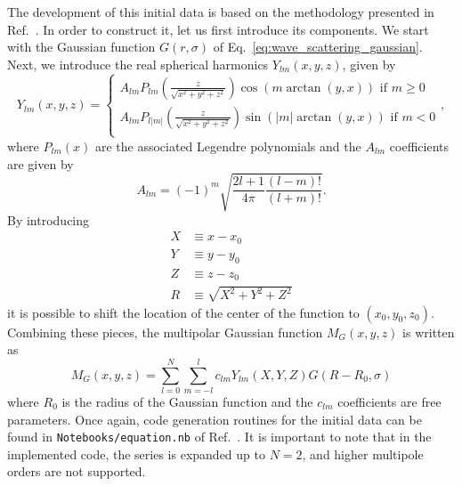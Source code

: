 The development of this initial data is based on the methodology presented in Ref.~\cite{PhysRevD.87.043513}. In order to construct it, let us first introduce its components. We start with the Gaussian function $G(r, \sigma)$ of Eq.~\eqref{eq:wave_scattering_gaussian}. Next, we introduce the real spherical harmonics $Y_{lm}(x,y,z)$, given by
%
\begin{equation}
  Y_{lm}(x, y, z) =
  \begin{cases}
    A_{lm} P_{lm}\left( \frac{z}{\sqrt{x^2 + y^2 + z^2}} \right) \cos(m \arctan(y,x)) \text{ if } m \geq 0  \\
    A_{lm} P_{l|m|}\left( \frac{z}{\sqrt{x^2 + y^2 + z^2}} \right) \sin(|m| \arctan(y,x)) \text{ if } m < 0 \\
  \end{cases}
  ,
  \label{eq:wave_scattering_real_spherical_harmonics}
\end{equation}
%
where $P_{lm}(x)$ are the associated Legendre polynomials and the $A_{lm}$ coefficients are given by
%
\begin{equation}
  A_{lm} = (-1)^m \sqrt{\frac{2 l + 1}{4\pi} \frac{(l-m)!}{(l+m)!}}.
  \label{eq:wave_scattering_real_spherical_harmonics_coeffs}
\end{equation}
%
By introducing
%
\begin{align}
  X & \equiv x - x_0 \label{eq:wave_scattering_real_spherical_harmonics_shifted_x}                \\
  Y & \equiv y - y_0 \label{eq:wave_scattering_real_spherical_harmonics_shifted_y}                \\
  Z & \equiv z - z_0 \label{eq:wave_scattering_real_spherical_harmonics_shifted_z}                \\
  R & \equiv \sqrt{X^2 + Y^2 + Z^2} \label{eq:wave_scattering_real_spherical_harmonics_shifted_r}
\end{align}
%
it is possible to shift the location of the center of the function to $(x_0,y_0,z_0)$. Combining these pieces, the multipolar Gaussian function $M_G(x,y,z)$ is written as
%
\begin{equation}
  M_G(x, y, z) = \sum_{l=0}^{N}\sum_{m = -l}^{l} c_{l m} Y_{l m}(X,Y,Z) G(R-R_0,\sigma)
  \label{eq:wave_scattering_multipolar_gaussian}
\end{equation}
%
where $R_0$ is the radius of the Gaussian function and the $c_{l m}$ coefficients are free parameters. Once again, code generation routines for the initial data can be found in \texttt{Notebooks/equation.nb} of Ref.~\cite{FieldPerturbationsRepo}. It is important to note that in the implemented code, the series is expanded up to $N = 2$, and higher multipole orders are not supported.

